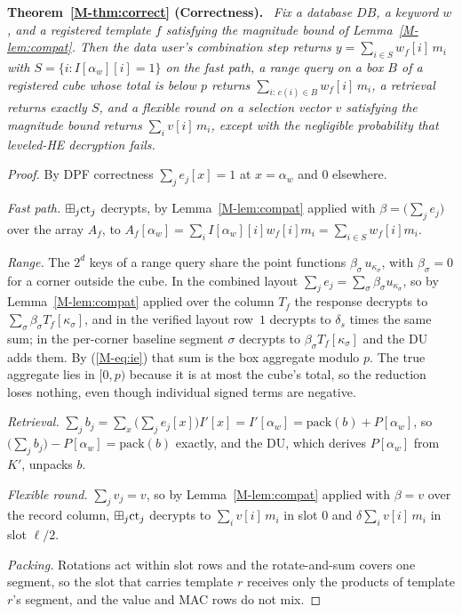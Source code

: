 \documentclass[11pt,a4paper]{article}
\newcommand{\mref}[1]{\ref{M-#1}}
\newcommand{\meqref}[1]{(\ref{M-#1})}
\newenvironment{restated}[1]{\par\medskip\noindent\textbf{#1.}\ \itshape}{\par\medskip}
\begin{document}
\begin{restated}{Theorem~\mref{thm:correct} (Correctness)}
Fix a database $DB$, a keyword $w$, and a registered template $f$ satisfying
the magnitude bound of Lemma~\mref{lem:compat}. Then the data user's combination step
returns $y=\sum_{i\in S} w_f[i]\,m_i$ with $S=\{i: I[\alpha_w][i]=1\}$ on the
fast path, a range query on a box $B$ of a registered cube whose total is
below $p$ returns $\sum_{i:\,c(i)\in B}w_f[i]\,m_i$, a retrieval
returns exactly $S$, and a flexible round on a selection vector $v$ satisfying
the magnitude bound returns $\sum_i v[i]\,m_i$, except with the negligible
probability that leveled-HE decryption fails.
\end{restated}
\begin{proof}
By DPF correctness $\sum_j e_j[x]=1$ at $x=\alpha_w$ and $0$ elsewhere.

\emph{Fast path.} $\boxplus_j\text{ct}_j$ decrypts, by Lemma~\mref{lem:compat}
applied with $\beta=\big(\sum_j e_j\big)$ over the array $A_f$, to
$A_f[\alpha_w]=\sum_i I[\alpha_w][i]w_f[i]m_i=\sum_{i\in S}w_f[i]m_i$.

\emph{Range.} The $2^d$ keys of a range query share the point functions
$\beta_\sigma\,u_{\kappa_\sigma}$, with $\beta_\sigma=0$ for a corner outside
the cube. In the combined layout $\sum_j e_j=\sum_\sigma\beta_\sigma
u_{\kappa_\sigma}$, so by Lemma~\mref{lem:compat} applied over the column $T_f$
the response decrypts to $\sum_\sigma\beta_\sigma T_f[\kappa_\sigma]$, and in
the verified layout row~$1$ decrypts to $\delta_s$ times the same sum; in the
per-corner baseline segment $\sigma$ decrypts to $\beta_\sigma
T_f[\kappa_\sigma]$ and the DU adds them. By \meqref{eq:ie} that sum is the box
aggregate modulo $p$. The true aggregate lies in $[0,p)$ because it is at most
the cube's total, so the reduction loses nothing, even though individual signed
terms are negative.

\emph{Retrieval.} $\sum_j b_j=\sum_x\big(\sum_j e_j[x]\big)
I'[x]=I'[\alpha_w]=\mathrm{pack}(b)+P[\alpha_w]$, so $\big(\sum_j
b_j\big)-P[\alpha_w]=\mathrm{pack}(b)$ exactly, and the DU, which derives
$P[\alpha_w]$ from $K'$, unpacks $b$.

\emph{Flexible round.} $\sum_j v_j=v$, so by Lemma~\mref{lem:compat} applied
with $\beta=v$ over the record column, $\boxplus_j\text{ct}_j$ decrypts to
$\sum_i v[i]\,m_i$ in slot $0$ and $\delta\sum_i v[i]\,m_i$ in slot $\ell/2$.

\emph{Packing.} Rotations act within slot rows and the rotate-and-sum covers
one segment, so the slot that carries template $r$ receives only the products
of template $r$'s segment, and the value and MAC rows do not mix.


\end{proof}
\end{document}
